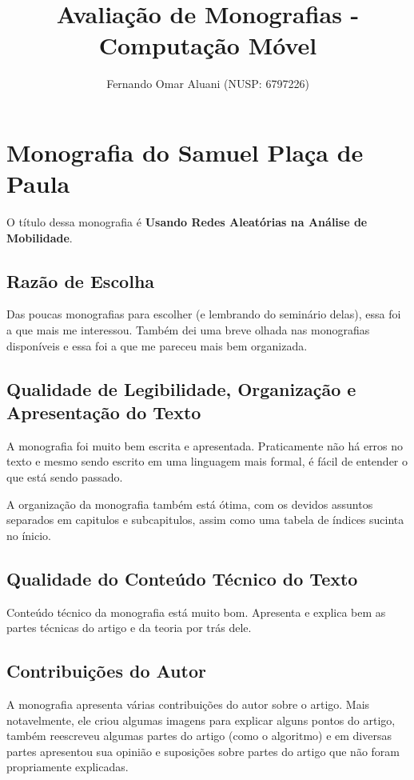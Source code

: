 \documentclass[a4paper,11pt]{article}
\title{Avaliação de Monografias - Computação Móvel}
\author{Fernando Omar Aluani (NUSP: 6797226)}
\begin{document}
\maketitle

\section{Monografia do Samuel Plaça de Paula}
O título dessa monografia é \textbf{Usando Redes Aleatórias na Análise de Mobilidade}.

\subsection{Razão de Escolha}
Das poucas monografias para escolher (e lembrando do seminário delas), essa foi a que mais me interessou.
Também dei uma breve olhada nas monografias disponíveis e essa foi a que me pareceu mais bem organizada.

\subsection{Qualidade de Legibilidade, Organização e Apresentação do Texto}
A monografia foi muito bem escrita e apresentada. Praticamente não há erros no texto e mesmo sendo
escrito em uma linguagem mais formal, é fácil de entender o que está sendo passado.

A organização da monografia também está ótima, com os devidos assuntos separados em capitulos e
subcapitulos, assim como uma tabela de índices sucinta no ínicio.

\subsection{Qualidade do Conteúdo Técnico do Texto}
Conteúdo técnico da monografia está muito bom. Apresenta e explica bem as partes técnicas do artigo
e da teoria por trás dele.

\subsection{Contribuições do Autor} %
A monografia apresenta várias contribuições do autor sobre o artigo. Mais notavelmente, ele criou algumas
imagens para explicar alguns pontos do artigo, também reescreveu algumas partes do artigo (como o algoritmo)
e em diversas partes apresentou sua opinião e suposições sobre partes do artigo que não foram propriamente
explicadas.
\end{document}
